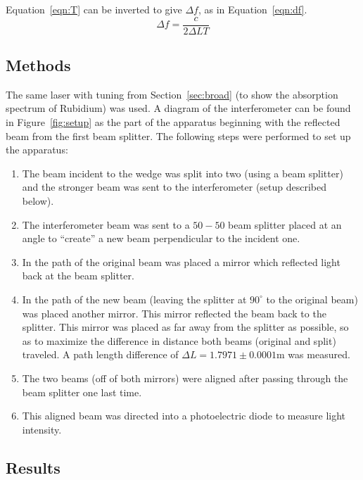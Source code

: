 \documentclass[paper=a4, fontsize=11pt]{scrartcl} %
\numberwithin{equation}{section}
\numberwithin{figure}{section}
\numberwithin{table}{section}
\begin{document}
 Equation~\ref{eqn:T} can be inverted to give $\Delta f$, as in Equation~\ref{eqn:df}.
\begin{equation}
\label{eqn:df}
\Delta f = \frac{c}{2\Delta L T}
\end{equation}

\subsection{Methods}

The same laser with tuning from Section~\ref{sec:broad} (to show the absorption spectrum of Rubidium) was used. A diagram of the
interferometer can be found in Figure~\ref{fig:setup} as the part of
the apparatus beginning with the reflected beam from the first beam splitter. The following steps were performed to set up the apparatus:
\begin{enumerate}
\item The beam incident to the wedge was split into two (using a beam splitter) and the stronger beam was sent to the interferometer (setup described below).
\item The interferometer beam was sent to a $50-50$ beam splitter placed at an angle to ``create'' a new beam perpendicular to the incident one.
\item In the path of the original beam was placed a mirror which reflected light back at the beam splitter.
\item In the path of the new beam (leaving the splitter at $90^\circ$
  to the original beam) was placed another mirror. This mirror
  reflected the beam back to the splitter. This mirror was placed as
  far away from the splitter as possible, so as to maximize the
  difference in distance both beams (original and split) traveled. A path length difference of $\Delta L=1.7971 \pm 0.0001$m was measured.
\item The two beams (off of both mirrors) were aligned after passing through the beam splitter one last time.
\item This aligned beam was directed into a photoelectric diode to measure light intensity.
\end{enumerate}

\subsection{Results}
\end{document}
